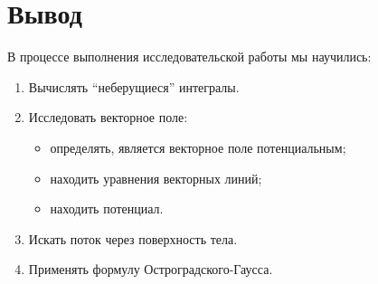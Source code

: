 \section{Вывод}
В процессе выполнения исследовательской работы мы научились:
\begin{enumerate}
  \item Вычислять ``неберущиеся'' интегралы.
  \item Исследовать векторное поле:
    \begin{itemize}
      \item определять, является векторное поле потенциальным;
      \item находить уравнения векторных линий;
      \item находить потенциал.
    \end{itemize}
  \item Искать поток через поверхность тела.
  \item Применять формулу Остроградского-Гаусса.
\end{enumerate}
